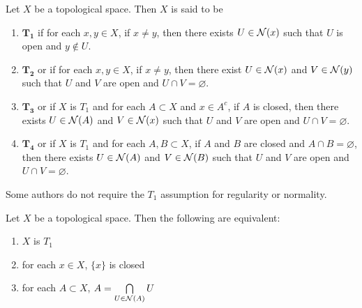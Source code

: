 \documentclass{book}
\begin{document}
	\begin{defn}
		Let $X$ be a topological space. Then $X$ is said to be 
		\begin{enumerate}
			\item $\mathbf{T_1}$ if for each $x,y \in X$, if $x \neq y$, then there exists $U \in \mathcal{N}(x)$ such that $U$ is open and $y \not \in U$.
			\item $\mathbf{T_2}$ or  if for each $x,y \in X$, if $x \neq y$, then there exist $U \in \mathcal{N}(x)$ and $V \in \mathcal{N}(y)$ such that $U$ and $V$ are open and $U \cap V = \varnothing$.
			\item $\mathbf{T_3}$ or  if $X$ is $T_1$ and for each $A \subset X$ and $x \in A^c$, if $A$ is closed, then there exists $U \in \mathcal{N}(A)$ and $V \in \mathcal{N}(x)$ such that $U$ and $V$ are open and $U \cap V = \varnothing$.
			\item $\mathbf{T_4}$ or  if $X$ is $T_1$ and for each $A,B \subset X$, if $A$ and $B$ are closed and $A \cap B = \varnothing$, then there exists $U \in \mathcal{N}(A)$ and $V \in \mathcal{N}(B)$ such that $U$ and $V$ are open and $U \cap V = \varnothing$.
		\end{enumerate}
	\end{defn}

	\begin{note}
		Some authors do not require the $T_1$ assumption for regularity or normality. 
	\end{note}

	\begin{ex}
		Let $X$ be a topological space. Then the following are equivalent:
		\begin{enumerate}
			\item $X$ is $T_1$
			\item for each $x \in X$, $\{x\}$ is closed
			\item for each $A \subset X$, $A = \bigcap\limits_{U \in \mathcal{N}(A)} U$
		\end{enumerate}
	\end{ex}
	
\end{document}

